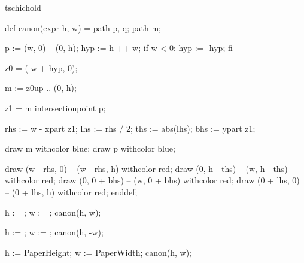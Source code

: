 


\startenvironment tschichold

	\setuppagenumbering[alternative=doublesided]

	\startMPdefinitions
		def canon(expr h, w) =
			path p, q;
			path m;

			p := (w, 0) -- (0, h); %
			hyp := h ++ w; %
			if w < 0:
				hyp := -hyp;
			fi

			z0 = (-w + hyp, 0); %

			m := z0{up} .. (0, h);

			z1 = m intersectionpoint p;

			rhs := w - xpart z1;
			lhs := rhs / 2;
			ths := abs(lhs); %
			bhs := ypart z1;

			draw m withcolor blue;
			draw p withcolor blue;

			draw (w - rhs, 0) -- (w - rhs, h) withcolor red;
			draw (0, h - ths) -- (w, h - ths) withcolor red;
			draw (0, 0 + bhs) -- (w, 0 + bhs) withcolor red;
			draw (0 + lhs, 0) -- (0 + lhs, h) withcolor red;
		enddef;
	\stopMPdefinitions

		h := \overlayheight;
		w := \overlaywidth;
		canon(h, w);
	\stopreusableMPgraphic

		h := \overlayheight;
		w := \overlaywidth;
		canon(h, -w);
	\stopreusableMPgraphic

	\startmode[debug]

		\setupbackgrounds[leftpage] [background=canon-verso]
		\setupbackgrounds[rightpage][background=canon-recto]
	\stopmode

	\startMPcalculation
		h := PaperHeight;
		w := PaperWidth;
		canon(h, w);

